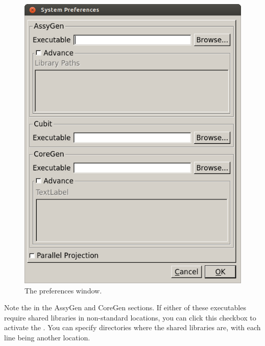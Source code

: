 \begin{figure}[H]
	\begin{center}
		\includegraphics[width=0.5\linewidth]{Images/mesh-2.png}
		\caption{The preferences window.}
		\label{fig:Mesh2}
	\end{center}
\end{figure}

Note the  in the AssyGen and CoreGen sections.  If either of these executables require shared libraries in non-standard locations, you can click this checkbox to activate the .  You can specify directories where the shared libraries are, with each line being another location.